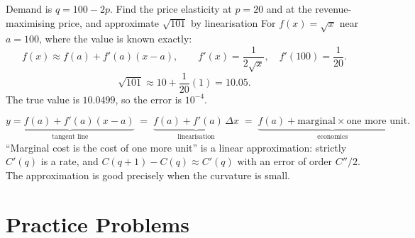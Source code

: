 \begin{worked}{Demand is $q=100-2p$. Find the price elasticity at $p=20$ and at the revenue-maximising price, and approximate $\sqrt{101}$ by linearisation}
For $f(x)=\sqrt{x}$ near $a=100$, where the value is known exactly:
\[
  f(x)\approx f(a)+f'(a)(x-a),
  \qquad
  f'(x)=\frac{1}{2\sqrt x},\quad f'(100)=\frac{1}{20} .
\]
\[
  \sqrt{101}\approx10+\frac{1}{20}(1)=10.05 .
\]
The true value is $10.0499$, so the error is $10^{-4}$.

\[
  \underbrace{y=f(a)+f'(a)(x-a)}_{\text{tangent line}}
  \;=\;
  \underbrace{f(a)+f'(a)\,\Delta x}_{\text{linearisation}}
  \;=\;
  \underbrace{f(a)+\text{marginal}\times\text{one more unit}}_{\text{economics}} .
\]
``Marginal cost is the cost of one more unit'' is a linear approximation:
strictly $C'(q)$ is a rate, and $C(q+1)-C(q)\approx C'(q)$ with an error of
order $C''/2$. The approximation is good precisely when the curvature is
small.
\end{worked}

\section{Practice Problems}

